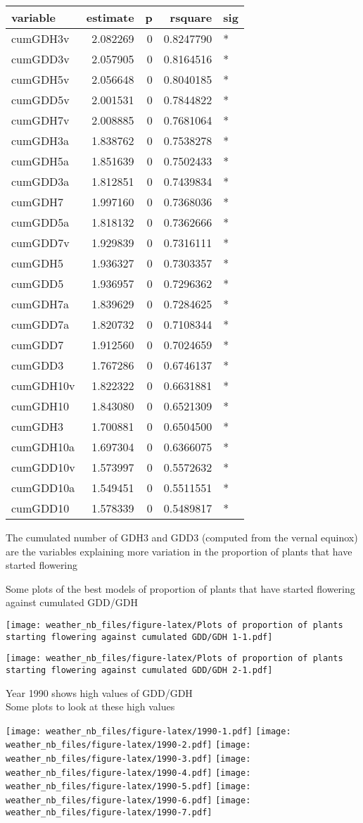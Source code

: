 \documentclass[10pt,]{article}
\begin{document}
\begin{longtable}[]{@{}lrrrl@{}}
\toprule
variable & estimate & p & rsquare & sig\tabularnewline
\midrule
\endhead
cumGDH3v & 2.082269 & 0 & 0.8247790 & *\tabularnewline
cumGDD3v & 2.057905 & 0 & 0.8164516 & *\tabularnewline
cumGDH5v & 2.056648 & 0 & 0.8040185 & *\tabularnewline
cumGDD5v & 2.001531 & 0 & 0.7844822 & *\tabularnewline
cumGDH7v & 2.008885 & 0 & 0.7681064 & *\tabularnewline
cumGDH3a & 1.838762 & 0 & 0.7538278 & *\tabularnewline
cumGDH5a & 1.851639 & 0 & 0.7502433 & *\tabularnewline
cumGDD3a & 1.812851 & 0 & 0.7439834 & *\tabularnewline
cumGDH7 & 1.997160 & 0 & 0.7368036 & *\tabularnewline
cumGDD5a & 1.818132 & 0 & 0.7362666 & *\tabularnewline
cumGDD7v & 1.929839 & 0 & 0.7316111 & *\tabularnewline
cumGDH5 & 1.936327 & 0 & 0.7303357 & *\tabularnewline
cumGDD5 & 1.936957 & 0 & 0.7296362 & *\tabularnewline
cumGDH7a & 1.839629 & 0 & 0.7284625 & *\tabularnewline
cumGDD7a & 1.820732 & 0 & 0.7108344 & *\tabularnewline
cumGDD7 & 1.912560 & 0 & 0.7024659 & *\tabularnewline
cumGDD3 & 1.767286 & 0 & 0.6746137 & *\tabularnewline
cumGDH10v & 1.822322 & 0 & 0.6631881 & *\tabularnewline
cumGDH10 & 1.843080 & 0 & 0.6521309 & *\tabularnewline
cumGDH3 & 1.700881 & 0 & 0.6504500 & *\tabularnewline
cumGDH10a & 1.697304 & 0 & 0.6366075 & *\tabularnewline
cumGDD10v & 1.573997 & 0 & 0.5572632 & *\tabularnewline
cumGDD10a & 1.549451 & 0 & 0.5511551 & *\tabularnewline
cumGDD10 & 1.578339 & 0 & 0.5489817 & *\tabularnewline
\bottomrule
\end{longtable}

The cumulated number of GDH3 and GDD3 (computed from the vernal equinox)
are the variables explaining more variation in the proportion of plants
that have started flowering

\newpage

Some plots of the best models of proportion of plants that have started
flowering against cumulated GDD/GDH

\texttt{[image: weather\_nb\_files/figure-latex/Plots of proportion of plants starting flowering against cumulated GDD/GDH 1-1.pdf]}

\texttt{[image: weather\_nb\_files/figure-latex/Plots of proportion of plants starting flowering against cumulated GDD/GDH 2-1.pdf]}

Year 1990 shows high values of GDD/GDH\\
Some plots to look at these high values

\texttt{[image: weather\_nb\_files/figure-latex/1990-1.pdf]}
\texttt{[image: weather\_nb\_files/figure-latex/1990-2.pdf]}
\texttt{[image: weather\_nb\_files/figure-latex/1990-3.pdf]}
\texttt{[image: weather\_nb\_files/figure-latex/1990-4.pdf]}
\texttt{[image: weather\_nb\_files/figure-latex/1990-5.pdf]}
\texttt{[image: weather\_nb\_files/figure-latex/1990-6.pdf]}
\texttt{[image: weather\_nb\_files/figure-latex/1990-7.pdf]}
\end{document}

